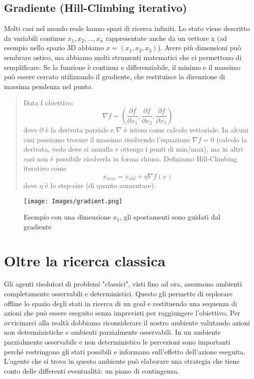 \documentclass{article}
\begin{document}
\subsection{Gradiente (Hill-Climbing iterativo)}
Molti casi nel mondo reale hanno spazi di ricerca infiniti. Lo stato viene descritto da variabili continue $x_1, x_2, ..., x_n$ rappresentate anche da un vettore x (ad esempio nello spazio 3D abbiamo $x=(x_1,x_2,x_3)$). Avere più dimensioni può sembrare ostico, ma abbiamo molti strumenti matematici che ci permettono di semplificare. \newline
Se la funzione è continua e differenziabile, il minimo e il massimo può essere cercato utilizzando il gradiente, che restituisce la direnzione di massima pendenza nel punto.
\begin{quote}
    Data f obiettivo:
    \[
    \nabla f = (\frac{\partial f}{\partial x_1}, \frac{\partial f}{\partial x_2}, \frac{\partial f}{\partial x_3})
    \] \newline dove $\partial$ è la derivata parziale e $\nabla$ è inteso come calcolo vettoriale. In alcuni casi possiamo trovare il massimo risolvendo l'equazione $\nabla f=0$ (calcolo la derivata, vedo dove si annulla e ottengo i punti di min/max), ma in altri casi non é possibile risolverla in forma chiusa.\newline
    Definiamo Hill-Climbing iterativo come
    \[
        x_{new} = x_{old} + \eta \nabla f(x)
    \]
    dove $\eta$ è lo step-size (di quanto aumentare).
\end{quote}
\begin{figure}[H]
    \centering
    \texttt{[image: Images/gradient.png]}
    \caption{Esempio con una dimensione $x_1$, gli spostamenti sono guidati dal gradiente}
\end{figure}

\clearpage

\section{Oltre la ricerca classica}
Gli agenti risolutori di problemi "classici", visti fino ad ora, assumono ambienti completamente osservabili e deterministici. Questo gli permette di esplorare offline lo spazio degli stati in ricerca di un goal e restituendo una sequenza di azioni che può essere eseguito senza imprevisti per raggiungere l'obiettivo. Per avvicinarci alla realtà dobbiamo riconsiderare il nostro ambiente valutando azioni non deterministiche e ambienti parzialmente osservabili. \newline
In un ambiente parzialmente osservabile e non deterministico le percezioni sono importanti perché restringono gli stati possibili e informano sull'effetto dell'azione eseguita. L'agente che si trova in questo ambiente può elaborare una strategia che tiene conto delle differenti eventualità: un piano di contingenza.
\end{document}

